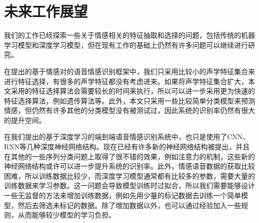\section{未来工作展望}
\label{sec:prospect}

我们的工作已经探索一些关于情感相关的特征抽取和选择的问题，包括传统的机器学习模型和深度学习模型，但在现有工作的基础上仍然有许多问题可以继续进行研究。

在提出的基于情感对的语音情感识别框架中，我们只采用比较小的声学特征集合来进行特征选择，有很多的声学特征都没有考虑进来。如果将声学特征集合扩大，本文采用的特征选择算法会需要较长的时间来执行，所以可以进一步采用更为快速的特征选择算法，例如遗传算法等。此外，本文只采用一些比较简单分类模型来预测情感，但仍然有许多其他的分类模型没有被测试过，因此系统的识别率仍然有很大的提升空间。

在我们提出的基于深度学习的端到端语音情感识别系统中，也只是使用了CNN、RNN等几种深度神经网络结构。现在已经有许多新的神经网络结构被提出，并且在其他的一些序列分类问题上取得了很不错的效果，例如注意力的机制，这些新的神经网络结构或许可以进一步提升系统的识别率。此外，情感语音数据的获取比较困难，所以训练数据比较少，而深度学习模型通常都有比较多的参数，需要大量的训练数据来学习参数。这一问题会导致模型训练时过拟合，所以我们需要能够设计一些无监督的方法来增加训练数据，例如先用少量的标记数据去训练一个简单模型，然后去筛选未标记的数据。除了增加数据以外，也可以通过经验加入一些规则，从而能够较少模型的学习负担。